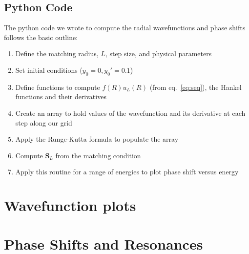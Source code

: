 \documentclass[]{scrartcl}
\begin{document}
\subsection*{Python Code}

The python code we wrote to compute the radial wavefunctions and phase shifts follows the basic outline:

\begin{enumerate}
	\item Define the matching radius, $L$, step size, and physical parameters
	\item Set initial conditions ($y_0 = 0, y_0 ' = 0.1$) 
	\item Define functions to compute $f(R)u_L(R)$ (from eq.~\ref{eq:seq}), the Hankel functions and their derivatives
	\item Create an array to hold values of the wavefunction and its derivative at each step along our grid
	\item Apply the Runge-Kutta formula to populate the array
	\item Compute $\mathbf{S}_L$ from the matching condition
	\item Apply this routine for a range of energies to plot phase shift versus energy
\end{enumerate}

\section*{Wavefunction plots}

\begin{figure}

\end{figure}


\section*{Phase Shifts and Resonances}



\end{document}
